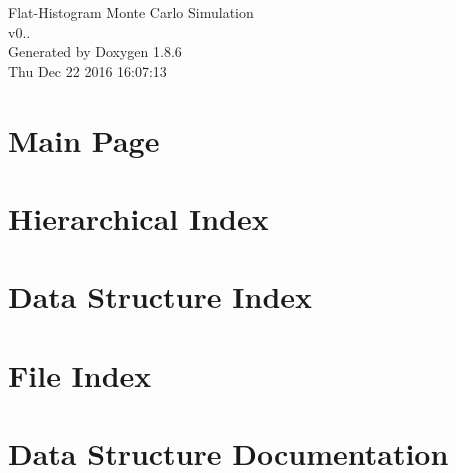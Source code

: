\documentclass[twoside]{book}
\newcommand{\clearemptydoublepage}{%
  \newpage{\pagestyle{empty}\cleardoublepage}%
}
\begin{document}
\hypersetup{pageanchor=false}
\begin{titlepage}
\vspace*{7cm}
\begin{center}%
{\Large Flat-\/\-Histogram Monte Carlo Simulation \\[1ex]\large v0.. }\\
\vspace*{1cm}
{\large Generated by Doxygen 1.8.6}\\
\vspace*{0.5cm}
{\small Thu Dec 22 2016 16:07:13}\\
\end{center}
\end{titlepage}
\clearemptydoublepage
\tableofcontents
\clearemptydoublepage
{}
\hypersetup{pageanchor=true}

\chapter{Main Page}
\label{index}\hypertarget{index}{}
\chapter{Hierarchical Index}

\chapter{Data Structure Index}

\chapter{File Index}

\chapter{Data Structure Documentation}































\end{document}
